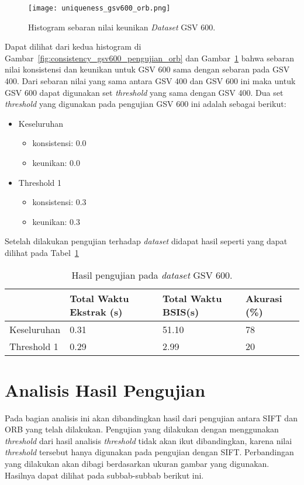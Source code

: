 \begin{figure}[H]
	\centering
	\texttt{[image: uniqueness\_gsv600\_orb.png]}
	\caption{Histogram sebaran nilai keunikan \textit{Dataset} GSV 600.}
	\label{fig:uniqueness_gsv600_pengujian_orb}
\end{figure}
Dapat dilihat dari kedua histogram di Gambar~\ref{fig:consistency_gsv600_pengujian_orb} dan Gambar~\ref{fig:uniqueness_gsv600_pengujian_orb} bahwa sebaran nilai konsistensi dan keunikan untuk GSV 600 sama dengan sebaran pada GSV 400. Dari sebaran nilai yang sama antara GSV 400 dan GSV 600 ini maka untuk GSV 600 dapat digunakan set \textit{threshold} yang sama dengan GSV 400. Dua set \textit{threshold} yang digunakan pada pengujian GSV 600 ini adalah sebagai berikut:
\begin{itemize}
	\item Keseluruhan
	\begin{itemize}
		\item konsistensi: 0.0
		\item keunikan: 0.0
	\end{itemize}
	\item Threshold 1
	\begin{itemize}
		\item konsistensi: 0.3
		\item keunikan: 0.3
	\end{itemize}
\end{itemize}
Setelah dilakukan pengujian terhadap \textit{dataset} didapat hasil seperti yang dapat dilihat pada Tabel~\ref{tab:pengujian_orb_gsv600}
\begin{table}[H]
	\centering
	\begin{tabular}{|l|l|l|l|}
		\hline
		& \textbf{Total Waktu Ekstrak (s)} & \textbf{Total Waktu BSIS(s)} & \textbf{Akurasi (\%)} \\ \hline
		Keseluruhan & 0.31 & 51.10                   & 78                    \\ \hline
		Threshold 1 & 0.29 & 2.99                    & 20                    \\ \hline
	\end{tabular}
	\caption{Hasil pengujian pada \textit{dataset} GSV 600.}
	\label{tab:pengujian_orb_gsv600}
\end{table}

\section{Analisis Hasil Pengujian}
Pada bagian analisis ini akan dibandingkan hasil dari pengujian antara SIFT dan ORB yang telah dilakukan. Pengujian yang dilakukan dengan menggunakan \textit{threshold} dari hasil analisis \textit{threshold} tidak akan ikut dibandingkan, karena nilai \textit{threshold} tersebut hanya digunakan pada pengujian dengan SIFT. Perbandingan yang dilakukan akan dibagi berdasarkan ukuran gambar yang digunakan. Hasilnya dapat dilihat pada subbab-subbab berikut ini.

